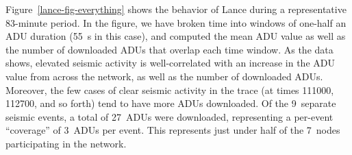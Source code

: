 Figure~\ref{lance-fig-everything} shows the behavior of Lance during a
representative 83-minute period. In the figure, we have broken time into
windows of one-half an ADU duration (55~s in this case), and computed the
mean ADU value as well as the number of downloaded ADUs that overlap each
time window. As the data shows, elevated seismic activity is well-correlated
with an increase in the ADU value from across the network, as well as the
number of downloaded ADUs. Moreover, the few cases of clear seismic activity
in the trace (at times 111000, 112700, and so forth) tend to have more ADUs
downloaded. Of the 9~separate seismic events, a total of 27~ADUs were
downloaded, representing a per-event ``coverage'' of 3~ADUs per event. This
represents just under half of the 7~nodes participating in the network.
